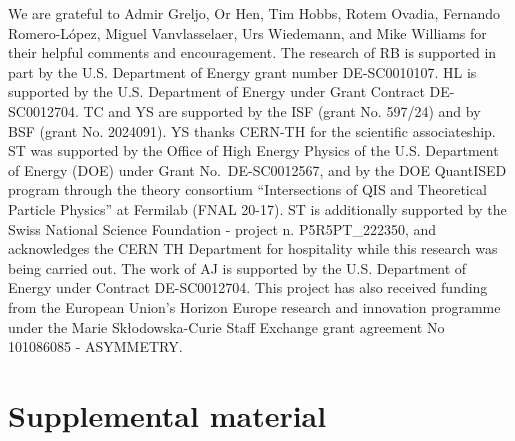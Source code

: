 \documentclass[aps,prd,preprintnumbers,superscriptaddress,nofootinbib,floatfix,twocolumn,notitlepage,reprint]{revtex4-2}
\begin{document}
\begin{acknowledgments}
We are grateful to Admir Greljo, Or Hen, Tim Hobbs, Rotem Ovadia, Fernando Romero-López, Miguel Vanvlasselaer, Urs Wiedemann, and Mike Williams for their helpful comments and encouragement.
%
The research of RB is supported in part by the U.S. Department of Energy grant number DE-SC0010107. HL is supported by the U.S. Department of
Energy under Grant Contract DE-SC0012704. 
TC and YS are supported by the ISF (grant No. 597/24) and by BSF (grant No. 2024091).
YS thanks CERN-TH for the scientific associateship.
ST was supported by the Office of High Energy Physics of the U.S. Department of Energy (DOE) under Grant No.~DE-SC0012567, and by the DOE QuantISED program through the theory consortium “Intersections of QIS and Theoretical Particle Physics” at Fermilab (FNAL 20-17).
ST is additionally supported by the Swiss National Science Foundation - project n. P5R5PT\_222350, and acknowledges the CERN TH Department for hospitality while this research was being carried out. 
The work of AJ is supported by the U.S. Department of Energy under Contract DE-SC0012704.
This project has also received funding from the European Union’s Horizon Europe research and innovation programme under the Marie Skłodowska-Curie Staff Exchange grant agreement No 101086085 - ASYMMETRY.
\end{acknowledgments}



\clearpage

\appendix

\onecolumngrid
\section*{Supplemental material}

\setcounter{equation}{0}
\setcounter{figure}{0}
\setcounter{table}{0}
\setcounter{page}{1}
\renewcommand{\thepage}{S\arabic{page}}
\makeatletter
\renewcommand{\thefigure}{S\arabic{figure}}
\renewcommand{\thetable}{S\arabic{table}}
\renewcommand{\theHfigure}{S\arabic{figure}}
\renewcommand{\theHtable}{S\arabic{table}}
\makeatother
\end{document}
